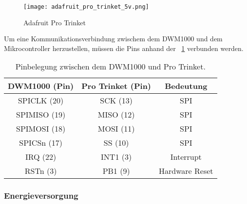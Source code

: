 \begin{figure}
	\centering
	\texttt{[image: adafruit\_pro\_trinket\_5v.png]}
	\caption[Adafruit Pro Trinket]{Adafruit Pro Trinket\protect\footnotemark}
	\label{fig:adafruit_pro_trinket}
\end{figure}


Um eine Kommunikationsverbindung zwischem dem DWM1000 und dem Mikrocontroller herzustellen, müssen die Pins anhand der \tablename~\ref{tab:pin_assignment_between_dwm1k_and_pro_trinket} verbunden werden.

\begin{table}
	\centering
	\begin{tabular}{||c|c|c||} 
		\hline
		DWM1000 (Pin)&Pro Trinket (Pin)&Bedeutung\\\hline
		\hline
		SPICLK (20)&SCK (13)&SPI\\\hline
		SPIMISO (19)&MISO (12)&SPI\\\hline
		SPIMOSI (18)&MOSI (11)&SPI\\\hline
		SPICSn (17)&SS (10)&SPI\\\hline
		\hline
		IRQ (22)&INT1 (3)&Interrupt\\\hline
		\hline
		RSTn (3)&PB1 (9)&Hardware Reset\\\hline
	\end{tabular}
	\caption{Pinbelegung zwischen dem DWM1000 und Pro Trinket.}
	\label{tab:pin_assignment_between_dwm1k_and_pro_trinket}
\end{table}


\begin{comment}
------------------------------------------------------------------------------------------
\end{comment}
\subsubsection{Energieversorgung}

